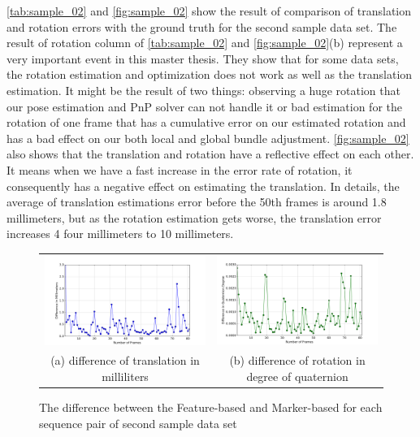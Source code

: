 \autoref{tab:sample_02} and \autoref{fig:sample_02} show the result of comparison of translation and rotation errors with the ground truth for the second sample data set. The result of rotation column of \autoref{tab:sample_02} and \autoref{fig:sample_02}(b) represent a very important event in this master thesis. They show that for some data sets, the rotation estimation and optimization does not work as well as the translation estimation. 
It might be the result of two things: observing a huge rotation that our pose estimation and PnP solver can not handle it or bad estimation for the rotation of one frame that has a cumulative error on our estimated rotation and has a bad effect on our both local and global bundle adjustment. \autoref{fig:sample_02} also shows that the translation and rotation have a reflective effect on each other. It means when we have a fast increase in the error rate of rotation, it consequently has a negative effect on estimating the translation. In details, the average of translation estimations error before the 50th frames is around 1.8 millimeters, but as the rotation estimation gets worse, the translation error increases 4 four millimeters to 10 millimeters.

\begin{figure}[H]
\begin{tabular}{cc}
  \includegraphics[width=80mm]{figures/diff_400/graph_translation} &  \includegraphics[width=80mm]{figures/diff_400/graph_rotation} \\
(a) difference of translation in milliliters & (b) difference of rotation in degree of quaternion \\[6pt]
\end{tabular}
\caption{The difference between the Feature-based and Marker-based for each sequence pair of second sample data set}\label{fig:sample_02_diff}
\end{figure}

